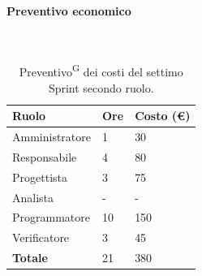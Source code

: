 \documentclass[8pt]{article}
\newcommand{\glossterm}[1]{#1\textsuperscript{G}} %
\newcommand{\subsubsubsection}[1]{\paragraph{#1}\mbox{}\\}
\begin{document}
\clearpage
\subsubsubsection{Preventivo economico}
\begin{table}[ht!]
	\centering
	\begin{tabular}{p{4cm} p{1cm} p{2cm}}
        \toprule
        \textbf{Ruolo} & \textbf{Ore} & \textbf{Costo (€)} \\
        \midrule
        Amministratore & 1  & 30   \\
        Responsabile   & 4  & 80 \\
        Progettista    & 3 & 75 \\
        Analista       & - & - \\
        Programmatore  & 10 & 150 \\
        Verificatore   & 3 & 45 \\
        \bottomrule
        \textbf{Totale} & 21 & 380
    \end{tabular}
    \caption{\glossterm{Preventivo} dei costi del settimo Sprint secondo ruolo.}
	\label{table:Preventivo dei costi del settimo Sprint secondo ruolo}
\end{table}
\end{document}
